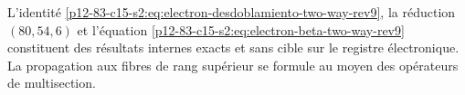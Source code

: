 \begin{statusbox}[title={Clôture interne du raffinement bidirectionnel}]
L'identité \eqref{p12-83-c15-s2:eq:electron-desdoblamiento-two-way-rev9}, la réduction
\((80,54,6)\) et l'équation
\eqref{p12-83-c15-s2:eq:electron-beta-two-way-rev9} constituent des résultats internes exacts
et sans cible sur le registre électronique. La propagation aux fibres de
rang supérieur se formule au moyen des opérateurs de multisection.
\end{statusbox}
